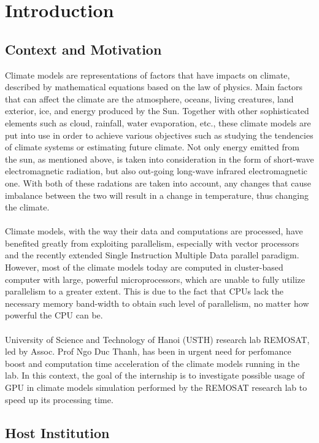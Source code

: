 \chapter{Introduction}

\section{Context and Motivation}

Climate models are representations of factors that have impacts on climate, described by mathematical equations based on the law of physics. Main factors that can affect the climate are the atmosphere, oceans, living creatures, land exterior, ice, and energy produced by the Sun. Together with other sophisticated elements such as cloud, rainfall, water evaporation, etc., these climate models are put into use in order to achieve various objectives such as studying the tendencies of climate systems or estimating future climate. Not only energy emitted from the sun, as mentioned above, is taken into consideration in the form of short-wave electromagnetic radiation, but also out-going long-wave infrared electromagnetic one. With both of these radations are taken into account, any changes that cause imbalance between the two will result in a change in temperature, thus changing the climate. \\
~\\
Climate models, with the way their data and computations are processed, have benefited greatly from exploiting parallelism, especially with vector processors and the recently extended Single Instruction Multiple Data parallel paradigm. However, most of the climate models today are computed in cluster-based computer with large, powerful microprocessors, which are unable to fully utilize parallelism to a greater extent. This is due to the fact that CPUs lack the necessary memory band-width to obtain such level of parallelism, no matter how powerful the CPU can be.\\
~\\
University of Science and Technology of Hanoi (USTH) research lab REMOSAT, led by Assoc. Prof Ngo Duc Thanh, has been in urgent need for perfomance boost and computation time acceleration of the climate models running in the lab. In this context, the goal of the internship is to investigate possible usage of GPU in climate models simulation performed by the REMOSAT research lab to speed up its processing time.\\

\section{Host Institution}

